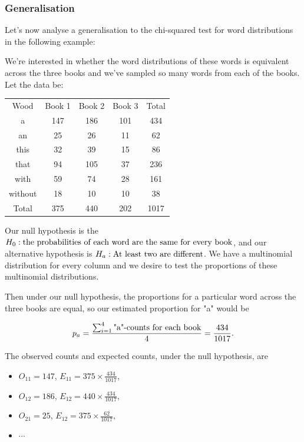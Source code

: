 \documentclass{homework}
\begin{document}
\clearpage

\subsubsection{Generalisation}

Let's now analyse a generalisation to the chi-squared test for word distributions in the following example: 

\begin{tcolorbox}[title= Example 1 of Generalised Chi-squared Independence Testing]

We're interested in whether the word distributions of these words is equivalent across the three books and we've sampled so many words from each of the books. Let the data be:

\begin{center}
\begin{tabular}{ |c|c|c|c|c| } 
 \hline
 Wood & Book 1 & Book 2 & Book 3 & Total \\
 a & 147 & 186 & 101 & 434\\ 
 an & 25 & 26 & 11 & 62 \\ 
 this & 32 & 39 & 15 & 86 \\
 that & 94 & 105 & 37 & 236 \\
 with & 59 & 74 & 28 & 161 \\
 without & 18 & 10 & 10 & 38 \\
 Total & 375 & 440 & 202 & 1017
\end{tabular}
\end{center}

Our null hypothesis is the $H_0 : \textnormal{the probabilities of each word are the same for every book}$, and our alternative hypothesis is $H_a : \textnormal{At least two are different}$. We have a multinomial distribution for every column and we desire to test the proportions of these multinomial distributions. 

Then under our null hypothesis, the proportions for a particular word across the three books are equal, so our estimated proportion for "a" would be 

$$
p_a = \frac{\sum_{i=1}^4\textnormal{"a"-counts for each book}}{4} =\frac{434}{1017}.
$$


The observed counts and expected counts, under the null hypothesis, are 

\begin{itemize}
    \item $O_{11} = 147$, $E_{11} = 375 \times \frac{434}{1017}$, 
    \item $O_{12} = 186$, $E_{12} = 440 \times \frac{434}{1017}$, 
    \item $O_{21} = 25$, $E_{12} = 375 \times \frac{62}{1017}$,
    \item $\cdots$
\end{itemize}


\end{tcolorbox}
\end{document}
